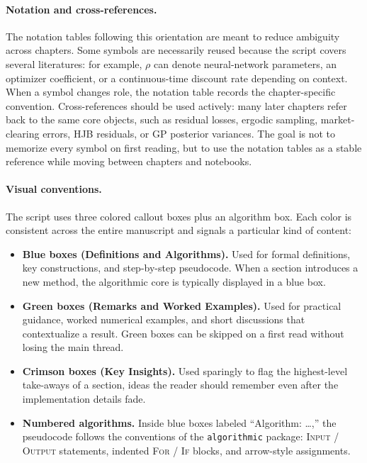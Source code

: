 \documentclass[11pt,a4paper]{report}
\begin{document}
\paragraph{Notation and cross-references.}
The notation tables following this orientation are meant to reduce ambiguity across chapters.  Some symbols are necessarily reused because the script covers several literatures: for example, $\rho$ can denote neural-network parameters, an optimizer coefficient, or a continuous-time discount rate depending on context.  When a symbol changes role, the notation table records the chapter-specific convention.  Cross-references should be used actively: many later chapters refer back to the same core objects, such as residual losses, ergodic sampling, market-clearing errors, HJB residuals, or GP posterior variances.  The goal is not to memorize every symbol on first reading, but to use the notation tables as a stable reference while moving between chapters and notebooks.

\paragraph{Visual conventions.}
The script uses three colored callout boxes plus an algorithm box.  Each color is consistent across the entire manuscript and signals a particular kind of content:

\begin{itemize}[itemsep=3pt]
\item \textbf{Blue boxes (Definitions and Algorithms).}  Used for formal definitions, key constructions, and step-by-step pseudocode.  When a section introduces a new method, the algorithmic core is typically displayed in a blue box.
\item \textbf{Green boxes (Remarks and Worked Examples).}  Used for practical guidance, worked numerical examples, and short discussions that contextualize a result.  Green boxes can be skipped on a first read without losing the main thread.
\item \textbf{Crimson boxes (Key Insights).}  Used sparingly to flag the highest-level take-aways of a section, ideas the reader should remember even after the implementation details fade.
\item \textbf{Numbered algorithms.}  Inside blue boxes labeled ``Algorithm: \ldots,'' the pseudocode follows the conventions of the \texttt{algorithmic} package: \textsc{Input} / \textsc{Output} statements, indented \textsc{For} / \textsc{If} blocks, and arrow-style assignments.
\end{itemize}
\end{document}
